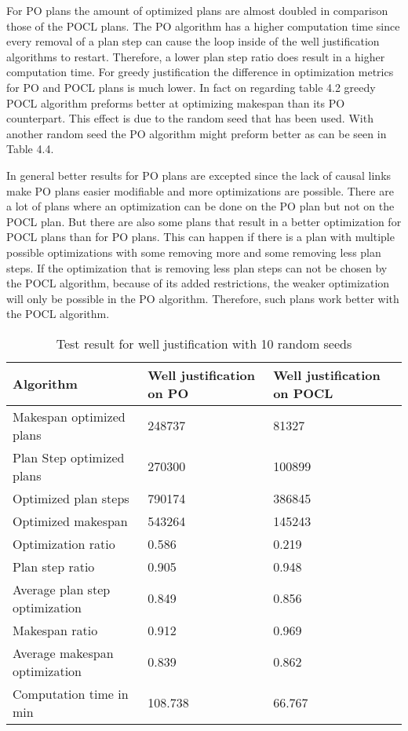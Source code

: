 For PO plans the amount of optimized plans are almost doubled in comparison those of the POCL plans.
The PO algorithm has a higher computation time since every removal of a plan step can cause the loop inside of the well justification algorithms to restart.
Therefore, a lower plan step ratio does result in a higher computation time.
For greedy justification the difference in optimization metrics for PO and POCL plans is much lower.
In fact on regarding table 4.2 greedy POCL algorithm preforms better at optimizing makespan than 
its PO counterpart. This effect is due to the random seed that has been used.
With another random seed the PO algorithm might preform better as can be seen in Table 4.4. 


In general better results for PO plans are excepted since 
the lack of causal links make PO plans easier modifiable and more optimizations are possible.
There are a lot of plans where an optimization can be done on the PO plan but not on the POCL plan.
But there are also some plans that result in a better optimization for POCL plans than for PO plans.
This can happen if there is a plan with multiple possible optimizations with some removing more
and some removing less plan steps. If the optimization that is removing less plan steps can not 
be chosen by the POCL algorithm, because of its added restrictions, the weaker optimization will only
be possible in the PO algorithm. Therefore, such plans work better with the POCL algorithm. 

\begin{table}[]
    \begin{tabular}{lll}
        \hline
        Algorithm                 & Well justification on PO & Well justification on POCL \\ \hline
        Makespan optimized plans  & 248737                   & 81327                      \\
        Plan Step optimized plans & 270300                   & 100899                     \\
        Optimized plan steps      & 790174                   & 386845                     \\
        Optimized makespan        & 543264                   & 145243                     \\
        Optimization ratio        & 0.586                    & 0.219                      \\
        Plan step ratio           & 0.905                    & 0.948                      \\
        Average plan step optimization &0.849                  &0.856                             \\
        Makespan ratio            & 0.912                    & 0.969                      \\
        Average makespan optimization & 0.839                  &0.862                              \\
        Computation time in min   & 108.738                  & 66.767                    
    \end{tabular}
    \caption{Test result for well justification with 10 random seeds}
\end{table}

